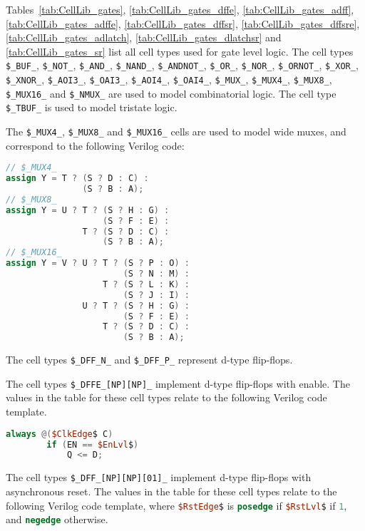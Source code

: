 Tables~\ref{tab:CellLib_gates}, \ref{tab:CellLib_gates_dffe}, \ref{tab:CellLib_gates_adff}, \ref{tab:CellLib_gates_adffe}, \ref{tab:CellLib_gates_dffsr}, \ref{tab:CellLib_gates_dffsre}, \ref{tab:CellLib_gates_adlatch}, \ref{tab:CellLib_gates_dlatchsr} and \ref{tab:CellLib_gates_sr} list all cell types used for gate level logic. The cell types
{\tt \$\_BUF\_}, {\tt \$\_NOT\_}, {\tt \$\_AND\_}, {\tt \$\_NAND\_}, {\tt \$\_ANDNOT\_},
{\tt \$\_OR\_}, {\tt \$\_NOR\_}, {\tt \$\_ORNOT\_}, {\tt \$\_XOR\_}, {\tt \$\_XNOR\_},
{\tt \$\_AOI3\_}, {\tt \$\_OAI3\_}, {\tt \$\_AOI4\_}, {\tt \$\_OAI4\_},
{\tt \$\_MUX\_}, {\tt \$\_MUX4\_}, {\tt \$\_MUX8\_}, {\tt \$\_MUX16\_} and {\tt \$\_NMUX\_} are used to model combinatorial logic.
The cell type {\tt \$\_TBUF\_} is used to model tristate logic.

The {\tt \$\_MUX4\_}, {\tt \$\_MUX8\_} and {\tt \$\_MUX16\_} cells are used to model wide muxes, and correspond to the following Verilog code:

\begin{lstlisting}[language=Verilog]
// $_MUX4_
assign Y = T ? (S ? D : C) :
               (S ? B : A);
// $_MUX8_
assign Y = U ? T ? (S ? H : G) :
                   (S ? F : E) :
               T ? (S ? D : C) :
                   (S ? B : A);
// $_MUX16_
assign Y = V ? U ? T ? (S ? P : O) :
                       (S ? N : M) :
                   T ? (S ? L : K) :
                       (S ? J : I) :
               U ? T ? (S ? H : G) :
                       (S ? F : E) :
                   T ? (S ? D : C) :
                       (S ? B : A);
\end{lstlisting}

The cell types {\tt \$\_DFF\_N\_} and {\tt \$\_DFF\_P\_} represent d-type flip-flops.

The cell types {\tt \$\_DFFE\_[NP][NP]\_}
implement d-type flip-flops with enable. The values in the table for these cell types relate to the
following Verilog code template.

\begin{lstlisting}[mathescape,language=Verilog]
	always @($ClkEdge$ C)
		if (EN == $EnLvl$)
			Q <= D;
\end{lstlisting}

The cell types {\tt \$\_DFF\_[NP][NP][01]\_} implement
d-type flip-flops with asynchronous reset. The values in the table for these cell types relate to the
following Verilog code template, where \lstinline[mathescape,language=Verilog];$RstEdge$; is \lstinline[language=Verilog];posedge;
if \lstinline[mathescape,language=Verilog];$RstLvl$; if \lstinline[language=Verilog];1;, and \lstinline[language=Verilog];negedge;
otherwise.

